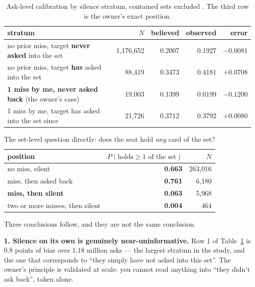 \documentclass[11pt]{article}
\begin{document}
\begin{table}[ht]
\centering
\caption{Ask-level calibration by silence stratum, contained sets excluded
\cite{asking}. The third row is the owner's exact position.}
\label{tab:strata}
\small
\begin{tabular}{@{}p{}rrrr@{}}
\toprule
stratum & $N$ & believed & observed & error \\
\midrule
no prior miss, target \textbf{never asked} into the set & 1{,}176{,}652 & 0.2007 & 0.1927
  & $\mathbf{-0.0081}$ \\
no prior miss, target \textbf{has} asked into the set & 88{,}419 & 0.3473 & 0.4181
  & $\mathbf{+0.0708}$ \\
\textbf{1 miss by me, never asked back} (the owner's case) & 19{,}003 & 0.1399 & 0.0199
  & $\mathbf{-0.1200}$ \\
1 miss by me, target has asked into the set since & 21{,}726 & 0.3712 & 0.3792
  & $+0.0080$ \\
\bottomrule
\end{tabular}
\end{table}

\begin{table}[ht]
\centering
\caption{The set-level question directly: does the seat hold \emph{any} card of the set?
\cite{asking}}
\label{tab:setlevel}
\small
\begin{tabular}{@{}lrr@{}}
\toprule
position & $P(\text{holds} \ge 1 \text{ of the set})$ & $N$ \\
\midrule
no miss, silent & \textbf{0.663} & 263{,}016 \\
miss, then asked back & \textbf{0.761} & 6{,}180 \\
\textbf{miss, then silent} & \textbf{0.063} & 5{,}968 \\
two or more misses, then silent & \textbf{0.004} & 464 \\
\bottomrule
\end{tabular}
\end{table}

Three conclusions follow, and they are not the same conclusion.

\textbf{1. Silence on its own is genuinely near-uninformative.} Row 1 of
Table~\ref{tab:strata} is $0.8$ points of bias over $1.18$ million asks --- the largest
stratum in the study, and the one that corresponds to ``they simply have not asked into
this set''. The owner's principle is validated at scale: you cannot read anything into
``they didn't ask back'', taken alone.
\end{document}
